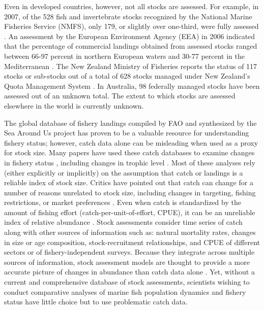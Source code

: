 \documentclass[letterpaper,12pt]{article}
\begin{document}
Even in developed countries, however, not all stocks are assessed.
For example, in 2007, of the 528 fish and invertebrate stocks
recognized by the National Marine Fisheries Service (NMFS), only 179,
or slightly over one-third, were fully assessed
\citep{NMFS:2008:status}.  An assessment by the European Environment
Agency (EEA) in 2006 indicated that the percentage of commercial
landings obtained from assessed stocks ranged between 66-97 percent in
northern European waters and 30-77 percent in the Mediterranean
\citep{eea:2009:status}.  The New Zealand Ministry of Fisheries
reports the status of 117 stocks or sub-stocks out of a total of 628
stocks managed under New Zealand's Quota Management System
\citep{NZMF:2009}.  In Australia, 98 federally managed stocks have
been assessed \citep{Wilson:etal:2009:status} out of an unknown total.
The extent to which stocks are assessed elsewhere in the world is
currently unknown.

The global database of fishery landings compiled by FAO \citep{FAO:fishstat}
and synthesized by the Sea Around Us project
\citep{Watson:etal:2004:fandf} has proven to be a valuable resource
for understanding fishery status; however, catch data alone can be
misleading when used as a proxy for stock size.  Many papers have used
these catch databases to examine changes in fishery status
\citep{Worm:etal:2006:science, Costello:etal:2008:science}, including
changes in trophic level \citep{Pauly:etal:1998,
  Essington:etal:2006:procnatacadsci, Newton:etal:2007:currentbiol}.
Most of these analyses rely (either explicitly or implicitly) on the
assumption that catch or landings is a reliable index of stock size.
Critics have pointed out that catch can change for a number of reasons
unrelated to stock size, including changes in targeting, fishing
restrictions, or market preferences \citep{deMutsert:etal:2008:pnas,
  Murawski:Methot:Tromble:2007:science, Hilborn:2007:science}.  Even
when catch is standardized by the amount of fishing effort
(catch-per-unit-of-effort, CPUE), it can be an unreliable index of
relative abundance \citep{Hutchings:Myers:1994:cjfas,
  Harley:etal:2001:cjfas, Walters:2003:cjfas, Polacheck:2006:marpol}.
Stock assessments consider time series of catch along with other
sources of information such as: natural mortality rates, changes in
size or age composition, stock-recruitment relationships, and CPUE of
different sectors or of fishery-independent surveys.  Because they
integrate across multiple sources of information, stock assessment
models are thought to provide a more accurate picture of changes in
abundance than catch data alone \citep{Sibert:etal:2006:science}. Yet,
without a current and comprehensive database of stock assessments,
scientists wishing to conduct comparative analyses of marine fish
population dynamics and fishery status have little choice but to use
problematic catch data.
\end{document}

